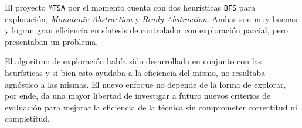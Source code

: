 El proyecto \texttt{MTSA} por el momento cuenta con dos heurísticas \texttt{BFS} para exploración, \textit{Monotonic Abstraction} y \textit{Ready Abstraction}. Ambas son muy buenas y logran gran eficiencia en síntesis de controlador con exploración parcial, pero presentaban un problema.

El algoritmo de exploración había sido desarrollado en conjunto con las heurísticas y si bien esto ayudaba a la eficiencia del mismo, no resultaba agnóstico a las mismas. El nuevo enfoque no depende de la forma de explorar, por ende, da una mayor libertad de investigar a futuro nuevos criterios de evaluación para mejorar la eficiencia de la técnica sin comprometer correctitud ni completitud.













